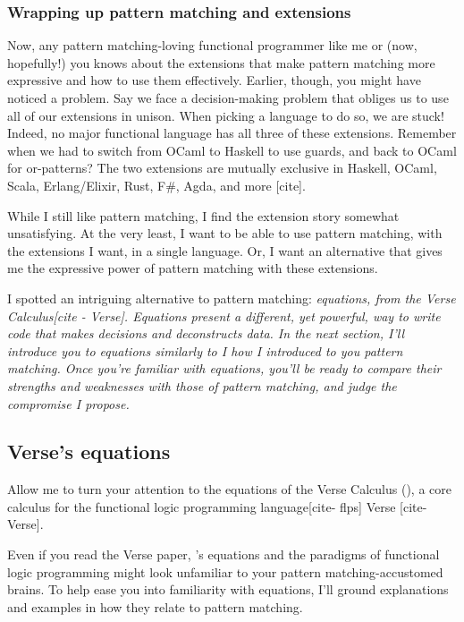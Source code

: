 \documentclass[manuscript,screen,review, 12pt, nonacm]{acmart}
\begin{document}
\begin{outline}[enumerate]
    \subsubsection{Wrapping up pattern matching and extensions}
    
    Now, any pattern matching-loving functional programmer like me or (now,
    hopefully!) you knows about the extensions that make pattern matching more
    expressive and how to use them effectively. Earlier, though, you might have
    noticed a problem. Say we face a decision-making problem that obliges us to
    use all of our extensions in unison. When picking a language to do so, we
    are stuck! Indeed, no major functional language has all three of these
    extensions. Remember when we had to switch from OCaml to Haskell to use
    guards, and back to OCaml for or-patterns? The two extensions are mutually
    exclusive in Haskell, OCaml, Scala, Erlang/Elixir, Rust, F\#, Agda, and more
    [cite]. 


    While I still like pattern matching, I find the extension story somewhat
    unsatisfying. At the very least, I want to be able to use pattern matching,
    with the extensions I want, in a single language. Or, I want an alternative
    that gives me the expressive power of pattern matching with these
    extensions. 

    I spotted an intriguing alternative to pattern matching: \it{equations},
    from the Verse Calculus[cite - Verse]. Equations present a different, yet
    powerful, way to write code that makes decisions and deconstructs data. In
    the next section, I'll introduce you to equations similarly to I how I
    introduced to you pattern matching. Once you're familiar with equations,
    you'll be ready to compare their strengths and weaknesses with those of
    pattern matching, and judge the compromise I propose. 

\subsection{Verse's equations}
    \label{verseoverobservers}

    Allow me to turn your attention to the equations of the Verse Calculus (\VC),
    a core calculus for the functional logic programming language[cite- flps]
    Verse [cite- Verse]. 

    Even if you read the Verse paper, \VC's equations and the paradigms of
    functional logic programming might look unfamiliar to your pattern
    matching-accustomed brains. To help ease you into familiarity with
    equations, I'll ground explanations and examples in how they relate to
    pattern matching. 


\end{outline}
\end{document}
